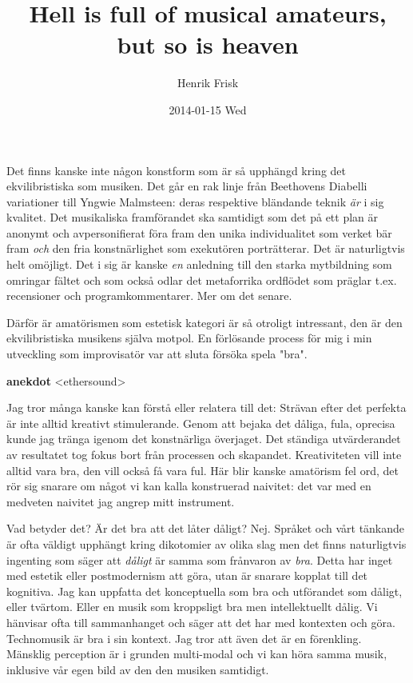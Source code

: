 \documentclass[11pt]{article}
\author{Henrik Frisk}
\date{2014-01-15 Wed}
\title{Hell is full of musical amateurs, but so is heaven}
\begin{document}
\maketitle
Det finns kanske inte någon konstform som är så upphängd kring det ekvilibristiska som musiken. Det går en rak linje från Beethovens Diabelli variationer till Yngwie Malmsteen: deras respektive bländande teknik \emph{är} i sig kvalitet. Det musikaliska framförandet ska samtidigt som det på ett plan är anonymt och avpersonifierat föra fram den unika individualitet som verket bär fram \emph{och} den fria konstnärlighet som exekutören porträtterar. Det är naturligtvis helt omöjligt. Det i sig är kanske \emph{en} anledning till den starka mytbildning som omringar fältet och som också odlar det metaforrika ordflödet som präglar t.ex. recensioner och programkommentarer. Mer om det senare.

Därför är amatörismen som estetisk kategori är så otroligt intressant, den är den ekvilibristiska musikens själva motpol. En förlösande process för mig i min utveckling som improvisatör var att sluta försöka spela "bra". 

\textbf{anekdot}
<ethersound>

Jag tror många kanske kan förstå eller relatera till det: Strävan efter det perfekta är inte alltid kreativt stimulerande.  Genom att bejaka det dåliga, fula, oprecisa kunde jag tränga igenom det konstnärliga överjaget. Det ständiga utvärderandet av resultatet tog fokus bort från processen och skapandet. Kreativiteten vill inte alltid vara bra, den vill också få vara ful. Här blir kanske amatörism fel ord, det rör sig snarare om något vi kan kalla konstruerad naivitet: det var med en medveten naivitet jag angrep mitt instrument.

Vad betyder det? Är det bra att det låter dåligt? Nej. Språket och vårt tänkande är ofta väldigt upphängt kring dikotomier av olika slag men det finns naturligtvis ingenting som säger att \emph{dåligt} är samma som frånvaron av \emph{bra}. Detta har inget med estetik eller postmodernism att göra, utan är snarare kopplat till det kognitiva. Jag kan uppfatta det konceptuella som bra och utförandet som dåligt, eller tvärtom. Eller en musik som kroppsligt bra men intellektuellt dålig. Vi hänvisar ofta till sammanhanget och säger att det har med kontexten och göra. Technomusik är bra i sin kontext. Jag tror att även det är en förenkling. Mänsklig perception är i grunden multi-modal och vi kan höra samma musik, inklusive vår egen bild av den den musiken samtidigt.
\end{document}
